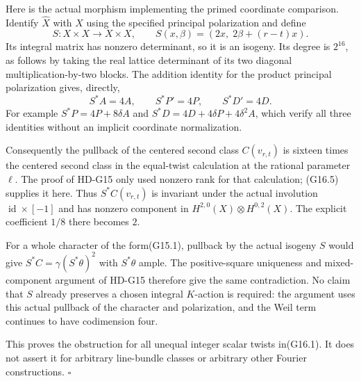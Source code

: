 Here is the actual morphism implementing the primed
coordinate comparison. Identify $\widehat X$ with $X$
using the specified principal polarization and define
\[
 S:X\times X\longrightarrow X\times X,\qquad
            S(x,\beta)=(2x,\;2\beta+(r-t)x).
                                                               \tag{G16.6}
\]
Its integral matrix has nonzero determinant, so it is
an isogeny. Its degree is $2^{16}$, as follows by taking
the real lattice determinant of its two diagonal
multiplication-by-two blocks. The addition identity
for the product principal polarization gives, directly,
\[
                       S^*A=4A,\qquad
                       S^*P'=4P,\qquad
                       S^*D'=4D.                         \tag{G16.7}
\]
For example
$S^*P=4P+8\delta A$ and
$S^*D=4D+4\delta P+4\delta^2A$, which verify all three
identities without an implicit coordinate normalization.

Consequently the pullback of the centered second class
$C(v_{r,t})$ is sixteen times the centered second class
in the equal-twist calculation at the rational parameter
$\ell$. The proof of HD-G15 only used nonzero rank for
that calculation; (G16.5) supplies it here.
Thus $S^*C(v_{r,t})$ is invariant under the actual
involution $\operatorname{id}\times[-1]$ and has
nonzero component in
$H^{2,0}(X)\otimes H^{0,2}(X)$.
The explicit coefficient $1/8$ there becomes $2$.

For a whole character of the form(G15.1), pullback by
the actual isogeny $S$ would give
$S^*C=\gamma(S^*\theta)^2$ with $S^*\theta$ ample.
The positive-square uniqueness and mixed-component
argument of HD-G15 therefore give the same contradiction.
No claim that $S$ already preserves a chosen integral
$K$-action is required: the argument uses this actual
pullback of the character and polarization, and the
Weil term continues to have codimension four.

This proves the obstruction for all unequal integer
scalar twists in(G16.1). It does not assert it for
arbitrary line-bundle classes or arbitrary other
Fourier constructions. \hfill$\square$
